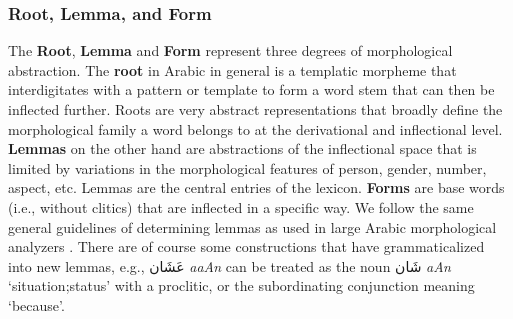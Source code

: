 

\subsubsection*{Root, Lemma, and Form}
The \textbf{Root}, \textbf{Lemma} and \textbf{Form} represent three degrees of morphological abstraction.
The \textbf{root} in Arabic in general is a templatic morpheme that interdigitates with a pattern or template to form a word stem that can then be inflected further. Roots are very abstract representations that broadly define the morphological family a word belongs to at the derivational and inflectional level. 
%
\textbf{Lemmas} on the other hand are abstractions of the inflectional space that is limited by variations in the morphological features of person, gender, number, aspect, etc. Lemmas are the central entries of the lexicon. 
\textbf{Forms} are base words (i.e., without clitics) that are inflected in a specific way. 
We follow the same general guidelines of determining lemmas as used in large Arabic morphological analyzers \citep{Graff:2009:standard,Habash:2012:morphological,Khalifa:2017:morphological}. There are of course some constructions that have grammaticalized into new lemmas, e.g., 
\foreignlanguage{arabic}{عَشَان} 
{\it {\AYN}a{\SHIN}aAn} can be treated as the noun  
\foreignlanguage{arabic}{شَان}
{\it {\SHIN}aAn} `situation;status' with a proclitic, or the subordinating conjunction meaning `because'.

